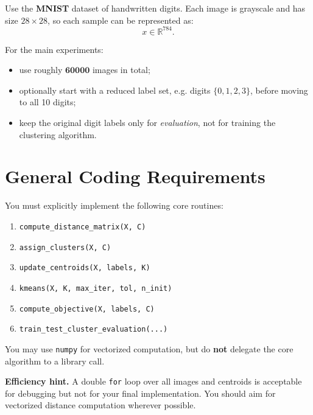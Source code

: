 \documentclass[11pt]{article}
\begin{document}
Use the \textbf{MNIST} dataset of handwritten digits.
Each image is grayscale and has size \(28 \times 28\), so each sample can be represented as:
\[
x \in \mathbb{R}^{784}.
\]

For the main experiments:
\begin{itemize}[itemsep=2pt]
    \item use roughly \(\mathbf{60000}\) images in total;
    \item optionally start with a reduced label set, e.g. digits \(\{0,1,2,3\}\), before moving to all 10 digits;
    \item keep the original digit labels only for \emph{evaluation}, not for training the clustering algorithm.
\end{itemize}

\section*{General Coding Requirements}

You must explicitly implement the following core routines:
\begin{enumerate}[label=\arabic*.]
    \item \texttt{compute\_distance\_matrix(X, C)}
    \item \texttt{assign\_clusters(X, C)}
    \item \texttt{update\_centroids(X, labels, K)}
    \item \texttt{kmeans(X, K, max\_iter, tol, n\_init)}
    \item \texttt{compute\_objective(X, labels, C)}
    \item \texttt{train\_test\_cluster\_evaluation(...)}
\end{enumerate}

You may use \texttt{numpy} for vectorized computation, but do \textbf{not} delegate the core algorithm to a library call.

\begin{hintbox}
\textbf{Efficiency hint.}
A double \texttt{for} loop over all images and centroids is acceptable for debugging but not for your final implementation.
You should aim for vectorized distance computation wherever possible.
\end{hintbox}


\end{document}
